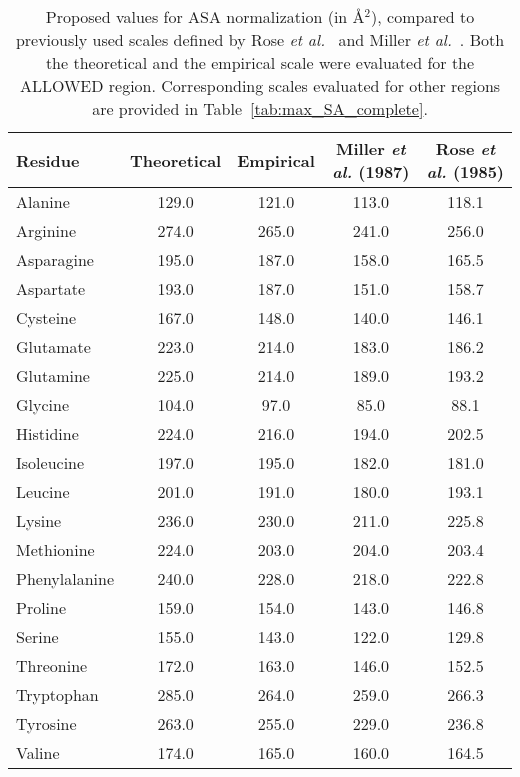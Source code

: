 \documentclass[11pt]{article}
\begin{document}
\begin{table}[H]
\caption{\label{tab:results}Proposed values for ASA normalization (in \AA$^2$), compared to previously used scales defined by Rose \emph{et al.}~\cite{Rose1985} and Miller \emph{et al.}~\cite{Miller1987}. Both the theoretical and the empirical scale were evaluated for the ALLOWED region. Corresponding scales evaluated for other regions are provided in Table~\ref{tab:max_SA_complete}.}

\begin{center}
\begin{tabular}{lcccc}
Residue & Theoretical & Empirical & Miller \emph{et al.} (1987) & Rose \emph{et al.} (1985) \\
\hline Alanine & 129.0 & 121.0 & 113.0 & 118.1 \\
Arginine        & 274.0 & 265.0 & 241.0 & 256.0 \\
Asparagine    & 195.0 & 187.0 & 158.0 & 165.5 \\
Aspartate      & 193.0 & 187.0 & 151.0 & 158.7 \\
Cysteine        & 167.0 & 148.0 & 140.0 & 146.1 \\
Glutamate     & 223.0 & 214.0 & 183.0 & 186.2 \\
Glutamine      & 225.0 & 214.0 & 189.0 & 193.2  \\
Glycine          & 104.0 & 97.0 & 85.0 & 88.1  \\
Histidine        & 224.0 & 216.0 & 194.0 & 202.5  \\
Isoleucine     & 197.0 & 195.0 & 182.0 & 181.0  \\
Leucine         & 201.0 & 191.0 & 180.0 & 193.1  \\
Lysine           & 236.0 & 230.0 & 211.0 & 225.8  \\
Methionine   & 224.0 & 203.0 & 204.0 & 203.4  \\
Phenylalanine  & 240.0 & 228.0 & 218.0 & 222.8  \\
Proline & 159.0 & 154.0& 143.0 & 146.8  \\
Serine          & 155.0 & 143.0 & 122.0 & 129.8  \\
Threonine          & 172.0 & 163.0 & 146.0 & 152.5  \\
Tryptophan          & 285.0 & 264.0 & 259.0 & 266.3  \\
Tyrosine          & 263.0 & 255.0 & 229.0 & 236.8 \\
Valine          & 174.0 & 165.0 & 160.0 & 164.5  \\
\hline
\end{tabular}
\end{center}
\end{table}
\end{document}

